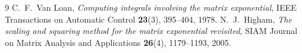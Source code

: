 \documentclass[11pt]{article}
\begin{document}
\begin{thebibliography}{9}
C.~F.~Van Loan,
\emph{Computing integrals involving the matrix exponential},
IEEE Transactions on Automatic Control \textbf{23}(3), 395--404, 1978.
N.~J.~Higham,
\emph{The scaling and squaring method for the matrix exponential revisited},
SIAM Journal on Matrix Analysis and Applications \textbf{26}(4), 1179--1193, 2005.
\end{thebibliography}
\end{document}
